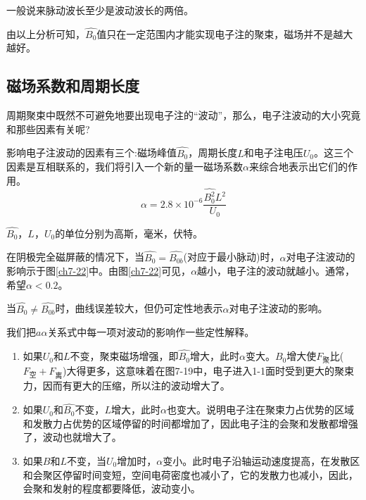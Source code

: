 一般说来脉动波长至少是波动波长的两倍。


由以上分析可知，$ \hat{B_0} $值只在一定范围内才能实现电子注的聚束，磁场并不是越大越好。


\subsection{磁场系数和周期长度}


周期聚束中既然不可避免地要出现电子注的“波动”，那么，电子注波动的大小究竟和那些因素有关呢?


影响电子注波动的因素有三个:磁场峰值$ \hat{B_0} $，周期长度$ L $和电子注电压$ U_0 $。这三个因素是互相联系的，我们将引入一个新的量一磁场系数$ \alpha $来综合地表示出它们的作用。
\begin{equation} \label{eq:ch7-7}
	\alpha = 2.8\times 10^{-6}\frac{\hat{B_0^2}L^2}{U_0}
\end{equation}

$ \hat{B_0} $，$ L $，$ U_0 $的单位分别为高斯，毫米，伏特。


在阴极完全磁屏蔽的情况下，当$ \hat{B_0}=\hat{B_{0b}}$(对应于最小脉动)时，$ \alpha $对电子注波动的影响示于图\ref{ch7-22}中。由图\ref{ch7-22}可见，$ \alpha $越小，电子注的波动就越小。通常，希望$ \alpha < 0.2 $。

当$ \hat{B_0} \neq \hat{B_{0b}}$时，曲线误差较大，但仍可定性地表示$ \alpha $对电子注波动的影响。


我们把$ a\alpha $关系式中每一项对波动的影响作一些定性解释。

\begin{enumerate}
	\item 如果$ U_0 $和$ L $不变，聚束磁场增强，即$ \hat{B_0} $增大，此时$ \alpha $变大。$ B_0 $增大使$ F_{\textrm{聚}} $比($  F_{\textrm{空}} +  F_{\textrm{离}} $)大得更多，这意味着在图7-19中，电子进入1-1面时受到更大的聚束力，因而有更大的压缩，所以注的波动增大了。
	\item 如果$ U_0 $和$ \hat{B_0} $不变，$ L $增大，此时$ \alpha $也变大。说明电子注在聚束力占优势的区域和发散力占优势的区域停留的时间都增加了，因此电子注的会聚和发散都增强了，波动也就增大了。
	\item 如果$ B $和$ L $不变，当$ U_0 $增加时，$ \alpha $变小。此时电子沿轴运动速度提高，在发散区和会聚区停留时间变短，空间电荷密度也减小了，它的发散力也减小，因此，会聚和发射的程度都要降低，波动变小。
\end{enumerate}



